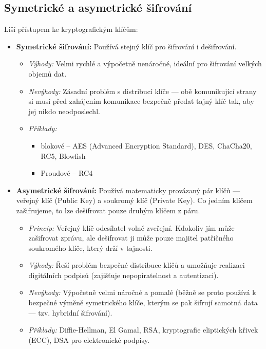 \subsection{Symetrické a asymetrické šifrování}
Liší přístupem ke kryptografickým klíčům:
\begin{itemize}
    \item \textbf{Symetrické šifrování:} Používá stejný klíč pro šifrování i dešifrování.
    \begin{itemize}
        \item \textit{Výhody:} Velmi rychlé a výpočetně nenáročné, ideální pro šifrování velkých objemů dat.
        \item \textit{Nevýhody:} Zásadní problém s distribucí klíče — obě komunikující strany si musí před zahájením komunikace bezpečně předat tajný klíč tak, aby jej nikdo neodposlechl.
        \item \textit{Příklady:} 
        \begin{itemize}
            \item blokové -- AES (Advanced Encryption Standard), DES, ChaCha20, RC5, Blowfish
            \item Proudové -- RC4
        \end{itemize}
    \end{itemize}
    \item \textbf{Asymetrické šifrování:} Používá matematicky provázaný pár klíčů — veřejný klíč (Public Key) a soukromý klíč (Private Key). Co jedním klíčem zašifrujeme, to lze dešifrovat pouze druhým klíčem z páru.
    \begin{itemize}
        \item \textit{Princip:} Veřejný klíč odesílatel volně zveřejní. Kdokoliv jím může zašifrovat zprávu, ale dešifrovat ji může pouze majitel patřičného soukromého klíče, který drží v tajnosti.
        \item \textit{Výhody:} Řeší problém bezpečné distribuce klíčů a umožňuje realizaci digitálních podpisů (zajišťuje nepopiratelnost a autentizaci).
        \item \textit{Nevýhody:} Výpočetně velmi náročné a pomalé (běžně se proto používá k bezpečné výměně symetrického klíče, kterým se pak šifrují samotná data — tzv. hybridní šifrování).
        \item \textit{Příklady:} Diffie-Hellman, El Gamal, RSA, kryptografie eliptických křivek (ECC), DSA pro elektronické podpisy.
    \end{itemize}
\end{itemize}

